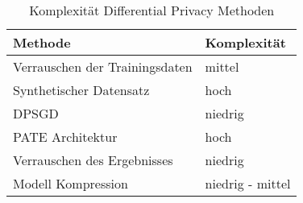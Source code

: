 \begin{table}[!htb]
\centering
\begin{tabular}{|l|l|}
\hline
\rowcolor[HTML]{CBCEFB} 
{\color[HTML]{000000} Methode} & Komplexität      \\ \hline
Verrauschen der Trainingsdaten & mittel           \\ \hline
Synthetischer Datensatz        & hoch             \\ \hline
DPSGD                          & niedrig          \\ \hline
PATE Architektur               & hoch             \\ \hline
Verrauschen des Ergebnisses    & niedrig          \\ \hline
Modell Kompression             & niedrig - mittel \\ \hline
\end{tabular}
\caption{Komplexität Differential Privacy Methoden}
\label{tab:dp_komplex}
\end{table}